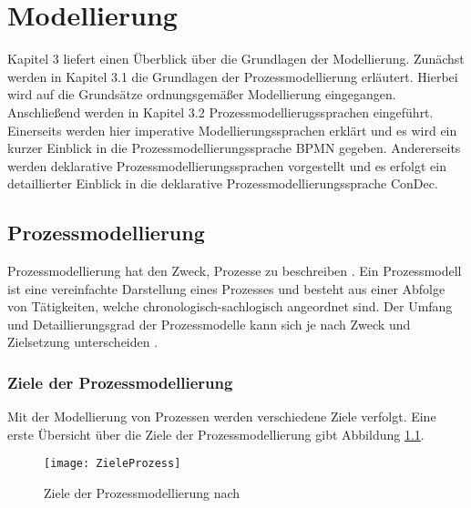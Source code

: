 
\chapter{Modellierung}\label{sec:chapter3}
Kapitel 3 liefert einen Überblick über die Grundlagen der Modellierung. Zunächst werden in Kapitel 3.1 die Grundlagen der Prozessmodellierung erläutert. Hierbei wird auf die Grundsätze ordnungsgemäßer Modellierung eingegangen. Anschließend werden in Kapitel 3.2 Prozessmodellierugssprachen eingeführt. Einerseits werden hier imperative Modellierungssprachen erklärt und es wird ein kurzer Einblick in die Prozessmodellierungssprache BPMN gegeben. Andererseits werden deklarative Prozessmodellierungssprachen vorgestellt und es erfolgt ein detaillierter Einblick in die deklarative Prozessmodellierungssprache ConDec.

\section{Prozessmodellierung}\label{sec:chapter3:Prozessmodellierung}

Prozessmodellierung hat den Zweck, Prozesse zu beschreiben \cite{fahland2009}. Ein Prozessmodell ist eine vereinfachte Darstellung eines Prozesses und besteht aus einer Abfolge von Tätigkeiten, welche chronologisch-sachlogisch angeordnet sind. Der Umfang und Detaillierungsgrad der Prozessmodelle kann sich je nach Zweck und Zielsetzung unterscheiden \cite{koch2011}.

\subsection{Ziele der Prozessmodellierung}
Mit der Modellierung von Prozessen werden verschiedene Ziele verfolgt. Eine erste Übersicht über die Ziele der Prozessmodellierung gibt Abbildung \ref{fig:ZieleProzess}.
\begin{figure}[htp]
\begin{center}
  \texttt{[image: ZieleProzess]} %
  \caption{Ziele der Prozessmodellierung nach \cite{koch2011}}
  \label{fig:ZieleProzess}
\end{center}
\end{figure}


